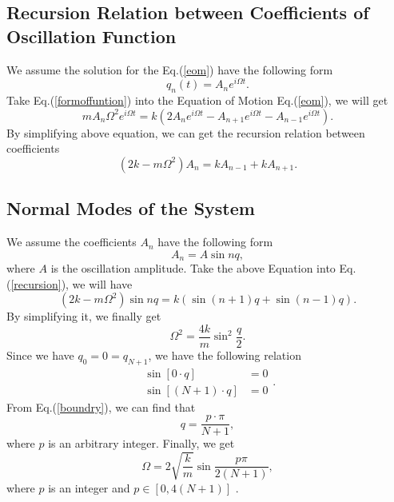 \documentclass[%
 reprint,
 amsmath,amssymb,
 aps,
]{revtex4-1}
\begin{document}
\subsection{Recursion Relation between Coefficients of Oscillation Function}
We assume the solution for the Eq.(\ref{eom}) have the following form
\begin{equation}
    q_n(t)=A_ne^{i\Omega t}.
    \label{formoffuntion}
\end{equation}
Take Eq.(\ref{formoffuntion}) into the Equation of Motion Eq.(\ref{eom}), we will get
\begin{equation}
    mA_n\Omega^2e^{i\Omega t}=k(2A_ne^{i\Omega t}-A_{n+1}e^{i\Omega t}-A_{n-1}e^{i\Omega t}).
\end{equation}
By simplifying above equation, we can get the recursion relation between coefficients
\begin{equation}
    (2k-m\Omega^2)A_n=kA_{n-1}+kA_{n+1}.
    \label{recursion}
\end{equation}
\subsection{Normal Modes of the System}
We assume the coefficients $A_n$ have the following form
\begin{equation}
    A_n=A\sin{nq},
\end{equation}
where $A$ is the oscillation amplitude. Take the above Equation into Eq.(\ref{recursion}), we will have
\begin{equation}
    (2k-m\Omega^2)\sin{nq}=k(\sin{(n+1)q}+\sin{(n-1)q}).
\end{equation}
By simplifying it, we finally get
\begin{equation}
    \Omega^2=\frac{4k}{m}\sin^2{\frac{q}{2}}. 
\end{equation}
Since we have $q_0=0=q_{N+1}$, we have the following relation
\begin{equation}
\begin{aligned}
\sin{[0\cdot q]}&=0\\
\sin{[(N+1)\cdot q]}&=0
\end{aligned}.
\label{boundry}
\end{equation}
From Eq.(\ref{boundry}), we can find that
\begin{equation}
    q=\frac{p\cdot\pi}{N+1},
\end{equation}
where $p$ is an arbitrary integer. Finally, we get
\begin{equation}
    \Omega=2\sqrt{\frac{k}{m}}\sin{\frac{p\pi}{2(N+1)}},
\end{equation}
where $p$ is an integer and $p\in[0,4(N+1)]$ .
\end{document}
